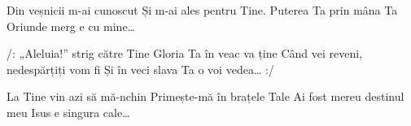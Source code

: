 
\beginverse
Din veșnicii m-ai cunoscut
Și m-ai ales pentru Tine.
Puterea Ta prin mâna Ta
Oriunde merg e cu mine…
\endverse

\beginchorus
/: „Aleluia!” strig către Tine
Gloria Ta în veac va ține
Când vei reveni, nedespărțiți vom fi
Și în veci slava Ta o voi vedea… :/
\endchorus

\beginverse
La Tine vin azi să mă-nchin
Primește-mă în brațele Tale
Ai fost mereu destinul meu
Isus e singura cale…
\endverse

\endsong